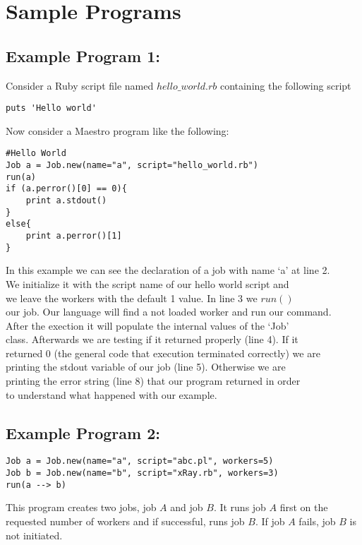 \section{Sample Programs}
\label{sect:samples}
\subsection*{Example Program 1:}
Consider a Ruby script file named $hello\_world.rb$ containing the following script
\begin{verbatim}
puts 'Hello world'
\end{verbatim}
Now consider a Maestro program like the following:
\begin{verbatim}
#Hello World
Job a = Job.new(name="a", script="hello_world.rb")
run(a)
if (a.perror()[0] == 0){
    print a.stdout()
}
else{
    print a.perror()[1]
}
\end{verbatim}
In this example we can see the declaration of a job with name `a' at line 2.\\
We initialize it with the script name of our hello world script and\\
we leave the workers with the default 1 value. In line 3 we $run()$\\
our job. Our language will find a not loaded worker and run our command.\\
After the exection it will populate the internal values of the `Job'\\
class. Afterwards we are testing if it returned properly (line 4). If it\\
returned 0 (the general code that execution terminated correctly) we are\\
printing the stdout variable of our job (line 5). Otherwise we are\\
printing the error string (line 8) that our program returned in order\\
to understand what happened with our example.\\

\subsection*{Example Program 2:}
\begin{verbatim}
Job a = Job.new(name="a", script="abc.pl", workers=5)
Job b = Job.new(name="b", script="xRay.rb", workers=3)
run(a --> b)
\end{verbatim}

This program creates two jobs, job $A$ and job $B$. It runs job $A$ first on the requested number of workers
and if successful, runs job $B$. If job $A$ fails, job $B$ is not initiated.
\\

